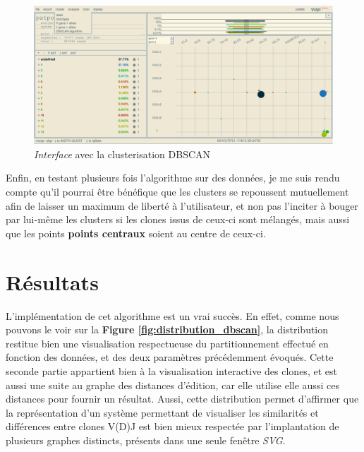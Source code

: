 \documentclass[pdftex,12pt,a4paper]{report}
\begin{document}
\begin{spacing}{1.2}
\begin{figure}[H]
\begin{center}
	\includegraphics[scale=0.35]{img/DBSCAN-Cluster-Ex.jpg}
\end{center}
\caption{\textit{Interface} avec la clusterisation DBSCAN}
\label{fig:clusterisation_dbscan}
\end{figure}

Enfin, en testant plusieurs fois l'algorithme sur des données, je me suis rendu compte qu'il pourrai être bénéfique que les clusters se repoussent mutuellement afin de laisser un maximum de liberté à l'utilisateur, et non pas l'inciter à bouger par lui-même les clusters si les clones issus de ceux-ci sont mélangés, mais aussi que les points \textbf{points centraux} soient au centre de ceux-ci.

\section{Résultats}

L'implémentation de cet algorithme est un vrai succès. En effet, comme nous pouvons le voir sur la \textbf{Figure \ref{fig:distribution_dbscan}}, la distribution restitue bien une visualisation respectueuse du partitionnement effectué en fonction des données, et des deux paramètres précédemment évoqués.
Cette seconde partie appartient bien à la visualisation interactive des clones, et est aussi une suite au graphe des distances d'édition, car elle utilise elle aussi ces distances pour fournir un résultat.
Aussi, cette distribution permet d'affirmer que la représentation d'un système permettant de visualiser les similarités et différences entre clones V(D)J est bien mieux respectée par l'implantation de plusieurs graphes distincts, présents dans une seule fenêtre \textit{SVG}.


\end{spacing}
\end{document}

